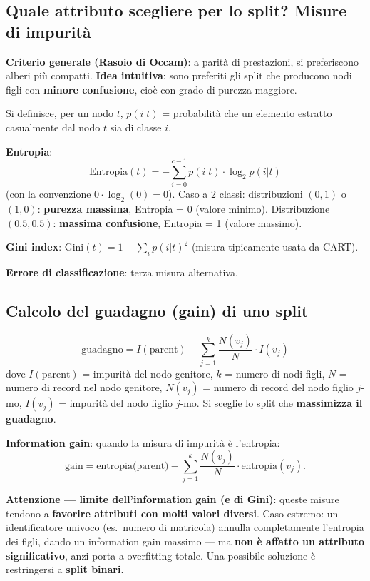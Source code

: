 \documentclass[11pt,a4paper]{report}
\begin{document}
\subsection*{Quale attributo scegliere per lo split? Misure di impurità}

\textbf{Criterio generale (Rasoio di Occam)}: a parità di prestazioni, si preferiscono alberi più compatti. \textbf{Idea intuitiva}: sono preferiti gli split che producono nodi figli con \textbf{minore confusione}, cioè con grado di purezza maggiore.

Si definisce, per un nodo $t$, $p(i|t)$ = probabilità che un elemento estratto casualmente dal nodo $t$ sia di classe $i$.

\textbf{Entropia}:
\[
\text{Entropia}(t) = -\sum_{i=0}^{c-1} p(i|t) \cdot \log_2 p(i|t)
\]
(con la convenzione $0\cdot\log_2(0)=0$). Caso a 2 classi: distribuzioni $(0,1)$ o $(1,0)$: \textbf{purezza massima}, Entropia = 0 (valore minimo). Distribuzione $(0.5,0.5)$: \textbf{massima confusione}, Entropia = 1 (valore massimo).

\textbf{Gini index}: $\text{Gini}(t) = 1 - \sum_i p(i|t)^2$ (misura tipicamente usata da CART).

\textbf{Errore di classificazione}: terza misura alternativa.

\subsection*{Calcolo del guadagno (gain) di uno split}

\[
\text{guadagno} = I(\text{parent}) - \sum_{j=1}^{k} \frac{N(v_j)}{N} \cdot I(v_j)
\]
dove $I(\text{parent})$ = impurità del nodo genitore, $k$ = numero di nodi figli, $N$ = numero di record nel nodo genitore, $N(v_j)$ = numero di record del nodo figlio $j$-mo, $I(v_j)$ = impurità del nodo figlio $j$-mo. Si sceglie lo split che \textbf{massimizza il guadagno}.

\textbf{Information gain}: quando la misura di impurità è l'entropia:
\[
\text{gain} = \text{entropia(parent)} - \sum_{j=1}^{k} \frac{N(v_j)}{N} \cdot \text{entropia}(v_j).
\]

\textbf{Attenzione --- limite dell'information gain (e di Gini)}: queste misure tendono a \textbf{favorire attributi con molti valori diversi}. Caso estremo: un identificatore univoco (es.\ numero di matricola) annulla completamente l'entropia dei figli, dando un information gain massimo --- ma \textbf{non è affatto un attributo significativo}, anzi porta a overfitting totale. Una possibile soluzione è restringersi a \textbf{split binari}.
\end{document}
